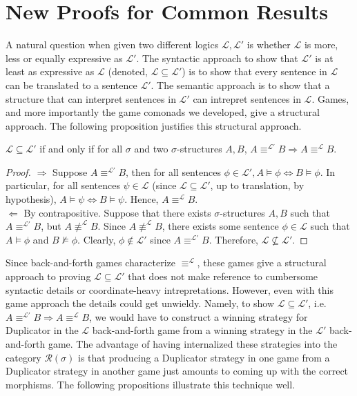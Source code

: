 \section{New Proofs for Common Results}\label{sec:commonResults}
A natural question when given two different logics $\mathcal{L},\mathcal{L'}$ is whether $\mathcal{L}$ is more, less or equally expressive as $\mathcal{L'}$. The syntactic approach to show that $\mathcal{L'}$ is at least as expressive as $\mathcal{L}$ (denoted, $\mathcal{L} \subseteq \mathcal{L'}$) is to show that every sentence in $\mathcal{L}$ can be translated to a sentence $\mathcal{L'}$. The semantic approach is to show that a structure that can interpret sentences in $\mathcal{L'}$ can intrepret sentences in $\mathcal{L}$. Games, and more importantly the game comonads we developed, give a structural approach. The following proposition justifies this structural approach. 
\begin{prop}
$\mathcal{L} \subseteq \mathcal{L'}$ if and only if for all $\sigma$ and two $\sigma$-structures $A,B$, $A \equiv^{\mathcal{L'}} B \Rightarrow A \equiv^{\mathcal{L}} B$.
\label{prop:inclusionToEquiv}
\begin{proof}
$\Rightarrow$ Suppose $A \equiv^{\mathcal{L'}} B$, then for all sentences $\phi \in \mathcal{L'}, A \vDash \phi \Leftrightarrow B \vDash \phi$. In particular, for all sentences $\psi \in \mathcal{L}$ (since $\mathcal{L} \subseteq \mathcal{L'}$, up to translation, by hypothesis), $A \vDash \psi \Leftrightarrow B \vDash \psi$. Hence, $A \equiv^{\mathcal{L}} B$.\\
$\Leftarrow$ By contrapositive. Suppose that there exists $\sigma$-structures $A,B$ such that $A \equiv^{\mathcal{L'}} B$, but $A \not \equiv^{\mathcal{L}} B$. Since $A \not \equiv^{\mathcal{L}} B$, there exists some sentence $\phi \in \mathcal{L}$ such that $A \vDash \phi$ and $B \not\vDash \phi$. Clearly, $\phi \not\in \mathcal{L'}$ since $A \equiv^{\mathcal{L'}} B$. Therefore, $\mathcal{L} \not\subseteq \mathcal{L'}$.
\end{proof}
\end{prop}
Since back-and-forth games characterize $\equiv^{\mathcal{L}}$, these games give a structural approach to proving $\mathcal{L} \subseteq \mathcal{L'}$ that does not make reference to cumbersome syntactic details or coordinate-heavy intrepretations. However, even with this game approach the details could get unwieldy. Namely, to show $\mathcal{L} \subseteq \mathcal{L'}$, i.e. $A \equiv^{\mathcal{L'}} B \Rightarrow A \equiv^{\mathcal{L}} B$, we would have to construct a winning strategy for Duplicator in the $\mathcal{L}$ back-and-forth game from a winning strategy in the $\mathcal{L'}$ back-and-forth game. The advantage of having internalized these strategies into the category $\mathcal{R}(\sigma)$ is that producing a Duplicator strategy in one game from a Duplicator strategy in another game just amounts to coming up with the correct morphisms. The following propositions illustrate this technique well. \\~\\

